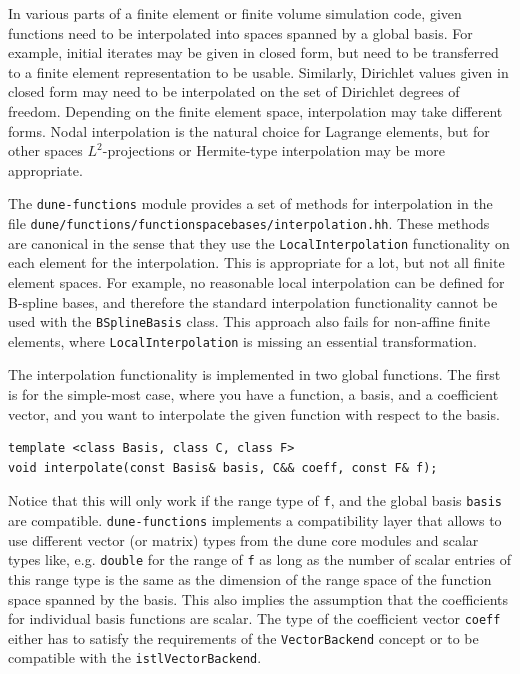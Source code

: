 \documentclass[a4paper,10pt,headings=normal,bibliography=totoc]{scrartcl}
\newcommand{\cpp}[1]{\lstinline[basicstyle=\ttfamily]!#1!}
\newcommand{\dunemodule}[1]{\texttt{#1}}
\newcommand{\file}[1]{\texttt{#1}}
\begin{document}
In various parts of a finite element or finite volume simulation code, given functions need to be interpolated
into spaces spanned by a global basis.  For example, initial iterates may be given in closed form, but need to be
transferred to a finite element representation to be usable.  Similarly, Dirichlet values given in closed form
may need to be interpolated on the set of Dirichlet degrees of freedom.  Depending on the finite element space,
interpolation may take different forms.  Nodal interpolation is the natural choice for Lagrange elements, but
for other spaces $L^2$-projections or Hermite-type interpolation may be more appropriate.

The \dunemodule{dune-functions} module provides a set of methods for interpolation in the file
\file{dune/functions/functionspacebases/interpolation.hh}.  These methods are canonical in the sense that
they use the \cpp{LocalInterpolation} functionality on each element for the interpolation.  This is appropriate
for a lot, but not all finite element spaces.  For example, no reasonable local interpolation can be defined
for B-spline bases, and therefore the standard interpolation functionality cannot be used with the
\cpp{BSplineBasis} class.
This approach also fails for non-affine finite elements, where \cpp{LocalInterpolation} is
missing an essential transformation.

The interpolation functionality is implemented in two global functions.
The first is for the simple-most case, where you have a function,
a basis, and a coefficient vector, and you want to interpolate
the given function with respect to the basis.

\begin{lstlisting}[style=Interface]
template <class Basis, class C, class F>
void interpolate(const Basis& basis, C&& coeff, const F& f);
\end{lstlisting}

Notice that this will only work if the range type of \cpp{f},
and the global basis \cpp{basis} are compatible.
\dunemodule{dune-functions} implements a compatibility layer
that allows to use different vector (or matrix) types
from the dune core modules and scalar types like, e.g. \cpp{double}
for the range of \cpp{f} as long as the number of scalar entries
of this range type is the same as the dimension of the range space of
the function space spanned by the basis.
This also implies the assumption that the coefficients for
individual basis functions are scalar.
The type of the coefficient vector \cpp{coeff}
either has to satisfy the requirements of the \cpp{VectorBackend}
concept or to be compatible with the
\cpp{istlVectorBackend}.
\end{document}
